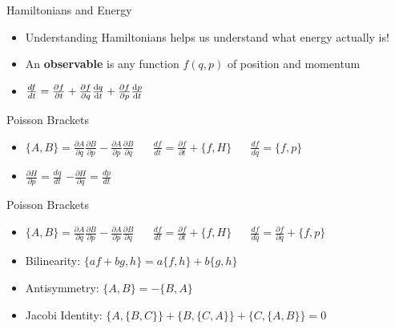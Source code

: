 \documentclass[10pt,xcolor={table,dvipsnames},t]{beamer}
\begin{document}
\begin{frame}{Hamiltonians and Energy}
    \begin{itemize}
        \item Understanding Hamiltonians helps us understand what energy actually is!
        \item An \textbf{observable} is any function $f(q,p)$ of position and momentum
        \pause \item $\frac{df}{dt} = \pdv{f}{t} + \pdv{f}{q}\dv{q}{t} + \pdv{f}{p}\dv{p}{t}$
    \end{itemize}
\end{frame}

\begin{frame}{Poisson Brackets}
    \begin{itemize}
        \item $\{A,B\} = \frac{\partial A}{\partial q} \frac{\partial B}{\partial p} - \frac{\partial A}{\partial p} \frac{\partial B}{\partial q} \hspace{20pt} \frac{df}{dt} = \frac{\partial f}{\partial t} + \{f,H\} \hspace{20pt} \frac{df}{dq} = \{f,p\}$
        \item $\frac{\partial H}{\partial p} = \frac{dq}{dt}$ \hspace{30pt} $-\frac{\partial H}{\partial q} = \frac{dp}{dt}$
    \end{itemize}
\end{frame}

\begin{frame}{Poisson Brackets}
    \begin{itemize}
        \item $\{A,B\} = \frac{\partial A}{\partial q} \frac{\partial B}{\partial p} - \frac{\partial A}{\partial p} \frac{\partial B}{\partial q} \hspace{20pt} \frac{df}{dt} = \frac{\partial f}{\partial t} + \{f,H\} \hspace{20pt} \frac{df}{dq} = \frac{\partial f}{\partial q} + \{f,p\}$ \newline
        \item Bilinearity: $\{af+bg,h\} = a\{f,h\} + b\{g,h\}$ \newline
        \item Antisymmetry: $ \{A,B\} = - \{B, A\}$ \newline
        \item Jacobi Identity: $\{A, \{B, C\}\} + \{B, \{C, A\}\} + \{C, \{A, B\}\} = 0$
    \end{itemize}
\end{frame}
\end{document}
